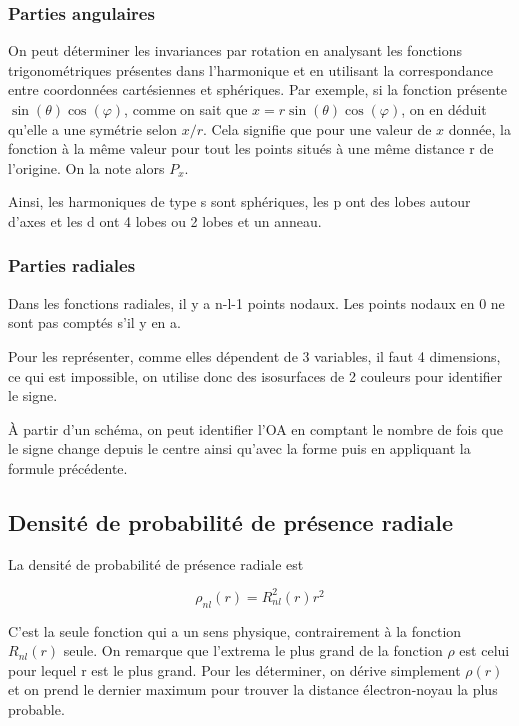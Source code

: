 \documentclass[french]{yLectureNote}
\begin{document}
\subsubsection{Parties angulaires}
On peut déterminer les invariances par rotation en analysant les fonctions trigonométriques présentes dans l'harmonique et en utilisant la correspondance entre coordonnées cartésiennes et sphériques. Par exemple, si la fonction présente \(\sin(\theta)\cos(\varphi)\), comme on sait que \(x = r \sin(\theta)\cos(\varphi)\), on en déduit qu'elle a une symétrie selon \(x/r\). Cela signifie que pour une valeur de \(x\) donnée, la fonction à la m\^eme valeur pour tout les points situés à une m\^eme distance r de l'origine. On la note alors \(P_x\).

Ainsi, les harmoniques de type s sont sphériques, les p ont des lobes autour d'axes et les d ont 4 lobes ou 2 lobes et un anneau.
\subsubsection{Parties radiales}
\begin{theorem}
 Dans les fonctions radiales, il y a n-l-1 points nodaux. Les points nodaux en 0 ne sont pas comptés s'il y en a.
\end{theorem}
Pour les représenter, comme elles dépendent de 3 variables, il faut 4 dimensions, ce qui est impossible, on utilise donc des isosurfaces de 2 couleurs pour identifier le signe.

À partir d'un schéma, on peut identifier l'OA en comptant le nombre de fois que le signe change depuis le centre ainsi qu'avec la forme puis en appliquant la formule précédente.
\subsection{Densité de probabilité de présence radiale}
La densité de probabilité de présence radiale est
\begin{theorem}
\[\rho_{nl}(r) = R^2_{nl}(r)r^2\]
\end{theorem}

C'est la seule fonction qui a un sens physique, contrairement à la fonction \(R_{nl}(r)\) seule. On remarque que l'extrema le plus grand de la fonction \(\rho\) est celui pour lequel r est le plus grand. Pour les déterminer, on dérive simplement \(\rho(r)\) et on prend le dernier maximum pour trouver la distance électron-noyau la plus probable.
\end{document}
